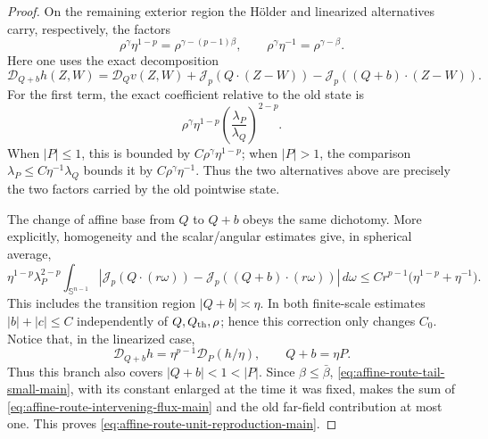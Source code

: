\documentclass[11pt,reqno]{amsart}
\numberwithin{equation}{section}
\newcommand{\Jp}{\mathcal J_p}
\newcommand{\dd}{\,d}
\theoremstyle{remark}
\begin{document}
\begin{proof}
On the remaining exterior region the H\"older and linearized alternatives
carry, respectively, the factors
\[
 \rho^\gamma\eta^{1-p}
 =\rho^{\gamma-(p-1)\beta},
 \qquad
 \rho^\gamma\eta^{-1}=\rho^{\gamma-\beta}.
\]
Here one uses the exact decomposition
\begin{equation*}
 \mathcal D_{Q+b}h(Z,W)
 =\mathcal D_Qv(Z,W)
 +\Jp(Q\cdot(Z-W))-\Jp((Q+b)\cdot(Z-W)).
\end{equation*}
For the first term, the exact coefficient relative to the old state is
\begin{equation*}
 \rho^\gamma\eta^{1-p}
 \left(\frac{\lambda_P}{\lambda_Q}\right)^{2-p}.
\end{equation*}
When \(|P|\le1\), this is bounded by
\(C\rho^\gamma\eta^{1-p}\); when \(|P|>1\), the comparison
\(\lambda_P\le C\eta^{-1}\lambda_Q\) bounds it by
\(C\rho^\gamma\eta^{-1}\).  Thus the two alternatives above are
precisely the two factors carried by the old pointwise state.

The change of affine base from \(Q\) to \(Q+b\) obeys the same
dichotomy.  More explicitly, homogeneity and the scalar/angular
estimates give, in spherical average,
\begin{equation*}
 \eta^{1-p}\lambda_P^{2-p}
 \int_{\mathbb S^{n-1}}
 \left|\Jp(Q\cdot(r\omega))
       -\Jp((Q+b)\cdot(r\omega))\right|\dd\omega
 \le Cr^{p-1}\bigl(\eta^{1-p}+\eta^{-1}\bigr).
\end{equation*}
This includes the transition region \(|Q+b|\asymp\eta\).  In both
finite-scale estimates
\(|b|+|c|\le C\) independently of \(Q,Q_{\rm th},\rho\); hence this
correction only changes \(C_0\).  Notice that, in the linearized case,
\[
 \mathcal D_{Q+b}h
 =\eta^{p-1}\mathcal D_P(h/\eta),
 \qquad Q+b=\eta P.
\]
Thus this branch also covers \(|Q+b|<1<|P|\).  Since
\(\beta\le\bar\beta\),
\eqref{eq:affine-route-tail-small-main}, with its constant enlarged at
the time it was fixed, makes the sum of
\eqref{eq:affine-route-intervening-flux-main} and the old far-field
contribution at most one.  This proves
\eqref{eq:affine-route-unit-reproduction-main}.
\end{proof}
\end{document}
